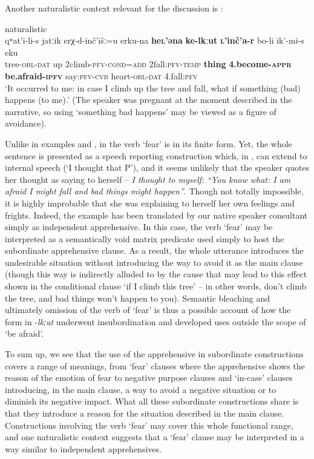 \documentclass[output=paper,colorlinks,citecolor=brown]{langscibook}
\begin{document}
 Another naturalistic context relevant for the discussion is :

\ea \label{ex:DD29} \textnormal{naturalistic} \\
\gll qʷat'i-li-s jatːik e{\textlangle}r{\textrangle}χ-d-inč'išː=u e{\textlangle}r{\textrangle}ku-na \textbf{he\textsc{l}'əna} \textbf{ke-lkːut} \textbf{\textsc{l}'inč'a-r} bo-li ik'-mi-s eku \\
tree-\textsc{obl-dat} up {\textlangle}2{\textrangle}climb-\textsc{pfv-cond=add} {\textlangle}2{\textrangle}fall:\textsc{pfv-temp} \textbf{thing} \textbf{4.become-\textsc{appr}} \textbf{be.afraid-\textsc{ipfv}} say:\textsc{pfv-cvb} heart-\textsc{obl-dat} 4.fall:\textsc{pfv} \\
\glt `It occurred to me: in case I climb up the tree and fall, what if something (bad) happens (to me).' (The speaker was pregnant at the moment described in the narrative, so using `something bad happens' may be viewed as a figure of avoidance).
\z

\noindent Unlike in examples  and , in  the verb `fear' is in its finite form. Yet, the whole sentence is presented as a speech reporting construction which, in , can extend to internal speech (`I thought that P'), and it seems unlikely that the speaker quotes her thought as saying to herself -- \textit{I thought to myself: ``You know what: I am afraid I might fall and bad things might happen''}. Though not totally impossible, it is highly improbable that she was explaining to herself her own feelings and frights. Indeed, the example has been translated by our native speaker consultant simply as independent apprehensive. In this case, the verb `fear' may be interpreted as a semantically void matrix predicate used simply to host the subordinate apprehensive clause. As a result, the whole utterance introduces the undesirable situation without introducing the way to avoid it as the main clause (though this way is indirectly alluded to by the cause that may lead to this effect shown in the conditional clause `if I climb this tree' -- in other words, don't climb the tree, and bad things won't happen to you). Semantic bleaching and ultimately omission of the verb of `fear' is thus a possible account of how the form in \nobreakdash-\textit{lkːut} underwent insubordination and developed uses outside the scope of `be afraid'. 

To sum up, we see that the use of the apprehensive in subordinate constructions covers a range of meanings, from `fear' clauses where the apprehensive shows the reason of the emotion of fear to negative purpose clauses and `in-case' clauses introducing, in the main clause, a way to avoid a negative situation or to diminish its negative impact. What all these subordinate constructions share is that they introduce a reason for the situation described in the main clause. Constructions involving the verb  `fear' may cover this whole functional range, and one naturalistic context suggests that a `fear' clause may be interpreted in a way similar to independent apprehensives.
 
\end{document}
